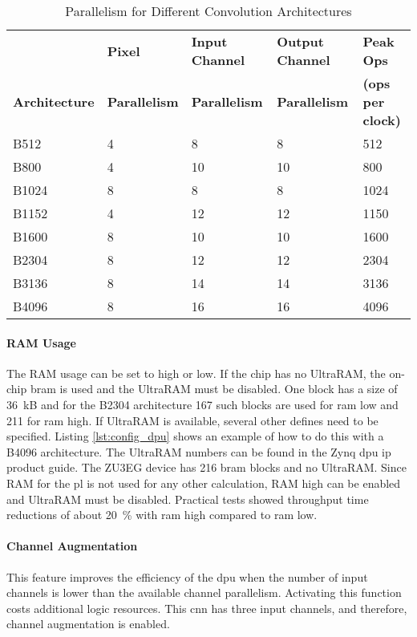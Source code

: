 \begin{table}
  \caption{Parallelism for Different Convolution Architectures \cite{dpu_product_guide}}
  \label{tab:arch_parallelism}
  \centering
  \begin{tabular}{lllll}
    \toprule
     & \textbf{Pixel} & \textbf{Input Channel} & \textbf{Output Channel} & \textbf{Peak Ops} \\
    \textbf{Architecture} & \textbf{Parallelism} & \textbf{Parallelism} & \textbf{Parallelism} & \textbf{(ops per clock)} \\
    \midrule
    B512 & 4 & 8 & 8 & 512 \\
    B800 & 4 & 10 & 10 & 800 \\
    B1024 & 8 & 8 & 8 & 1024 \\
    B1152 & 4 & 12 & 12 & 1150 \\
    B1600 & 8 & 10 & 10 & 1600 \\
    B2304 & 8 & 12 & 12 & 2304 \\
    B3136 & 8 & 14 & 14 & 3136 \\
    B4096 & 8 & 16 & 16 & 4096 \\
    \bottomrule
  \end{tabular}
\end{table}

\paragraph{RAM Usage}
The RAM usage can be set to high or low.
If the chip has no UltraRAM, the on-chip \acrshort{bram} is used and the UltraRAM must be disabled.
One block has a size of \SI{36}{kB} and for the B2304 architecture 167 such blocks are used for \acrshort{ram} low and 211 for \acrshort{ram} high.
If UltraRAM is available, several other defines need to be specified.
Listing \ref{lst:config_dpu} shows an example of how to do this with a B4096 architecture.
The UltraRAM numbers can be found in the Zynq \acrshort{dpu} \acrshort{ip} product guide.
The ZU3EG device has 216 \acrfull{bram} blocks and no UltraRAM.
Since RAM for the \acrshort{pl} is not used for any other calculation, RAM high can be enabled and UltraRAM must be disabled.
Practical tests showed throughput time reductions of about \SI{20}{\percent} with \acrshort{ram} high compared to \acrshort{ram} low.

\paragraph{Channel Augmentation}
This feature improves the efficiency of the \acrshort{dpu} when the number of input channels is lower than the available channel parallelism.
Activating this function costs additional logic resources.
This \acrshort{cnn} has three input channels, and therefore, channel augmentation is enabled.

